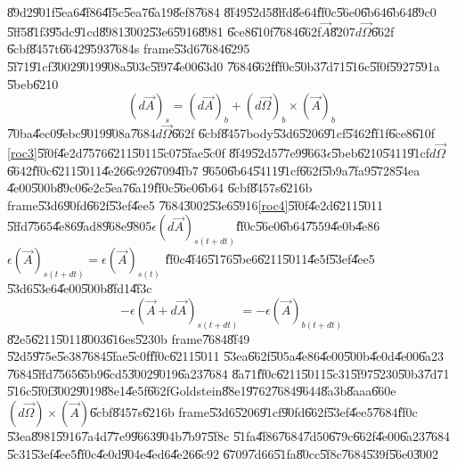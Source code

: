 \documentclass[12pt,a4paper]{article}
\begin{document}
\U{89d2}\U{901f}\U{5ea6}\U{4f86}\U{4f5c}\U{5ea7}\U{6a19}\U{8ef8}\U{7684}%
\U{8f49}\U{52d5}\U{8ffd}\U{8e64}\U{ff0c}\U{56e0}\U{6b64}\U{6b64}\U{89c0}%
\U{5ff5}\U{81f3}\U{95dc}\U{91cd}\U{8981}\U{3002}\U{53e6}\U{5916}\U{8981}%
\U{6ce8}\U{610f}\U{7684}\U{662f}$\vec{A}$\U{8207}$d\vec{\Omega}$\U{662f}%
\U{6cbf}\U{8457}t\U{6642}\U{9593}\U{7684}s frame\U{53d6}\U{7684}\U{6295}%
\U{5f71}\U{91cf}\U{3002}\U{9019}\U{908a}\U{503c}\U{5f97}\U{4e00}\U{63d0}%
\U{7684}\U{662f}\U{ff0c}\U{50b3}\U{7d71}\U{516c}\U{5f0f}\U{5927}\U{591a}%
\U{5beb}\U{6210}%
\begin{equation*}
\left( d\vec{A}\right) _{s}=\left( d\vec{A}\right) _{b}+\left( d\vec{\Omega}%
\right) _{b}\times \left( \vec{A}\right) _{b}
\end{equation*}%
\U{70ba}\U{4ec0}\U{9ebc}\U{9019}\U{908a}\U{7684}$d\vec{\Omega}$\U{662f}%
\U{6cbf}\U{8457}body\U{53d6}\U{5206}\U{91cf}\U{5462}\U{ff1f}\U{6ce8}\U{610f}%
\ref{roc3}\U{5f0f}\U{4e2d}\U{7576}\U{6211}\U{5011}\U{5c07}\U{5fae}\U{5c0f}%
\U{8f49}\U{52d5}\U{77e9}\U{9663}$\epsilon $\U{5beb}\U{6210}\U{5411}\U{91cf}$d%
\vec{\Omega}$\U{6642}\U{ff0c}\U{6211}\U{5011}\U{4e26}\U{6c92}\U{6709}\U{4fb7}%
\U{9650}\U{6b64}\U{5411}\U{91cf}\U{662f}\U{5b9a}\U{7fa9}\U{5728}\U{54ea}%
\U{4e00}\U{500b}\U{89c0}\U{6e2c}\U{5ea7}\U{6a19}\U{ff0c}\U{56e0}\U{6b64}%
\U{6cbf}\U{8457}s\U{6216}b frame\U{53d6}\U{90fd}\U{662f}\U{53ef}\U{4ee5}%
\U{7684}\U{3002}\U{53e6}\U{5916}\ref{roc4}\U{5f0f}\U{4e2d}\U{6211}\U{5011}%
\U{5ffd}\U{7565}\U{4e86}\U{9ad8}\U{968e}\U{9805}$\epsilon \left( d\vec{A}%
\right) _{s(t+dt)}$\U{ff0c}\U{56e0}\U{6b64}\U{7559}\U{4e0b}\U{4e86}$\epsilon
\left( \vec{A}\right) _{s(t+dt)}=\epsilon \left( \vec{A}\right) _{s(t)}$%
\U{ff0c}\U{4f46}\U{5176}\U{5be6}\U{6211}\U{5011}\U{4e5f}\U{53ef}\U{4ee5}%
\U{53d6}\U{53e6}\U{4e00}\U{500b}\U{8fd1}\U{4f3c}%
\begin{equation*}
-\epsilon \left( \vec{A}+d\vec{A}\right) _{s(t+dt)}=-\epsilon \left( \vec{A}%
\right) _{b(t+dt)}
\end{equation*}%
\U{82e5}\U{6211}\U{5011}\U{8003}\U{616e}s\U{5230}b frame\U{7684}\U{8f49}%
\U{52d5}\U{975e}\U{5e38}\U{7684}\U{5fae}\U{5c0f}\U{ff0c}\U{6211}\U{5011}%
\U{53ea}\U{662f}\U{505a}\U{4e86}\U{4e00}\U{500b}\U{4e0d}\U{4e00}\U{6a23}%
\U{7684}\U{5ffd}\U{7565}\U{65b9}\U{6cd5}\U{3002}\U{9019}\U{6a23}\U{7684}%
\U{8a71}\U{ff0c}\U{6211}\U{5011}\U{5c31}\U{5f97}\U{5230}\U{50b3}\U{7d71}%
\U{516c}\U{5f0f}\U{3002}\U{9019}\U{88e1}\U{4e5f}\U{662f}Goldstein\cite%
{goldstein}\U{88e1}\U{9762}\U{7684}\U{9644}\U{8a3b}\U{8aaa}\U{660e}$\left( d%
\vec{\Omega}\right) \times \left( \vec{A}\right) $\U{6cbf}\U{8457}s\U{6216}b
frame\U{53d6}\U{5206}\U{91cf}\U{90fd}\U{662f}\U{53ef}\U{4ee5}\U{7684}\U{ff0c}%
\U{53ea}\U{8981}\U{5916}\U{7a4d}\U{77e9}\U{9663}\U{904b}\U{7b97}\U{5f8c}%
\U{51fa}\U{4f86}\U{7684}\U{7d50}\U{679c}\U{662f}\U{4e00}\U{6a23}\U{7684}%
\U{5c31}\U{53ef}\U{4ee5}\U{ff0c}\U{4e0d}\U{904e}\U{4ed6}\U{4e26}\U{6c92}%
\U{6709}\U{7d66}\U{51fa}\U{80cc}\U{5f8c}\U{7684}\U{539f}\U{56e0}\U{3002}
\end{document}
